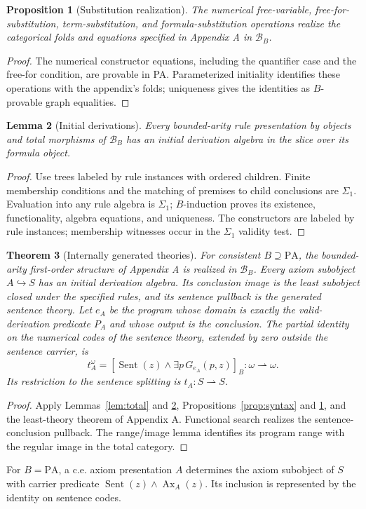 \documentclass[11pt]{article}
\newtheorem{theorem}{Theorem}[section]
\newtheorem{lemma}[theorem]{Lemma}
\newtheorem{proposition}[theorem]{Proposition}
\theoremstyle{definition}\newtheorem{definition}[theorem]{Definition}
\newcommand{\PA}{\mathrm{PA}}
\newcommand{\Sent}{\operatorname{Sent}}
\newcommand{\B}{\mathcal B}
\begin{document}
\begin{proposition}[Substitution realization]\label{prop:substitution}
The numerical free-variable, free-for-substitution, term-substitution,
and formula-substitution operations realize the categorical folds and
equations specified in Appendix A in $\B_B$.
\end{proposition}
\begin{proof}
The numerical constructor equations, including the quantifier case
and the free-for condition, are provable in PA. Parameterized initiality identifies
these operations with the appendix's folds; uniqueness gives the
identities as $B$-provable graph equalities.
\end{proof}

\begin{lemma}[Initial derivations]\label{lem:proof-initial}
Every bounded-arity rule presentation by objects and total morphisms
of $\B_B$ has an initial derivation algebra in the slice over its
formula object.
\end{lemma}
\begin{proof}
Use trees labeled by rule instances with ordered children.
Finite membership conditions and the matching of premises to child
conclusions are $\Sigma_1$. Evaluation into any rule algebra is
$\Sigma_1$; $B$-induction proves its existence, functionality,
algebra equations, and uniqueness. The constructors are labeled by
rule instances; membership witnesses occur in the $\Sigma_1$ validity test.
\end{proof}

\begin{theorem}[Internally generated theories]\label{thm:internal}
For consistent $B\supseteq\PA$, the bounded-arity first-order
structure of Appendix A is realized in $\B_B$. Every axiom
subobject $A\hookrightarrow S$ has an initial derivation algebra.
Its conclusion image is the least subobject closed under the
specified rules, and its sentence pullback is the generated sentence
theory. Let $e_A$ be the program whose domain is exactly the
valid-derivation predicate $P_A$ and whose output is the conclusion.
The partial identity on the numerical codes of the sentence theory,
extended by zero outside the sentence carrier, is
\[
 t_A^{\omega}=[\Sent(z)\land\exists p\,G_{e_A}(p,z)]_B:
 \omega\rightharpoonup\omega.
\]
Its restriction to the sentence splitting is
$t_A:S\rightharpoonup S$.
\end{theorem}
\begin{proof}
Apply Lemmas~\ref{lem:total} and \ref{lem:proof-initial},
Propositions~\ref{prop:syntax} and \ref{prop:substitution}, and the
least-theory theorem of Appendix A. Functional search realizes the
sentence-conclusion pullback. The range/image lemma identifies its
program range with the regular image in the total category.
\end{proof}
For $B=\PA$, a c.e. axiom presentation $A$ determines the axiom
subobject of $S$ with carrier predicate
$\Sent(z)\land\operatorname{Ax}_A(z)$. Its inclusion is represented
by the identity on sentence codes.
\end{document}
